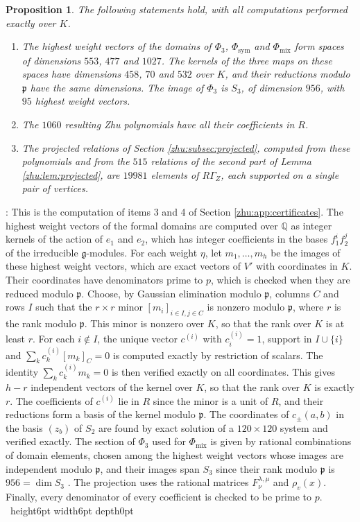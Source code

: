 \documentclass[leqno]{article}
\newcommand{\qed}{\hfill \vrule height6pt  width6pt depth0pt}
\newtheorem{prop}[thm]{Proposition}
\newenvironment{proof}[1][]{\noindent {\it Proof #1} : }{\hbox{~}\qed
\smallskip
}
\numberwithin{equation}{section}
\begin{document}
\begin{prop}
\label{zhu:prop:exact-families}
The following statements hold, with all computations performed exactly over $K$.
\begin{enumerate}
\item The highest weight vectors of the domains of $\Phi_3$, $\Phi_{\mathrm{sym}}$ and $\Phi_{\mathrm{mix}}$ form spaces of dimensions $553$, $477$ and $1027$. The kernels of the three maps on these spaces have dimensions $458$, $70$ and $532$ over $K$, and their reductions modulo $\mathfrak p$ have the same dimensions. The image of $\Phi_3$ is $S_3$, of dimension $956$, with $95$ highest weight vectors.
\item The $1060$ resulting Zhu polynomials have all their coefficients in $R$.
\item The projected relations of Section \ref{zhu:subsec:projected}, computed from these polynomials and from the $515$ relations of the second part of Lemma \ref{zhu:lem:projected}, are $19981$ elements of $R\Gamma_Z$, each supported on a single pair of vertices.
\end{enumerate}
\end{prop}

\begin{proof}
This is the computation of items 3 and 4 of Section \ref{zhu:app:certificates}. The highest weight vectors of the formal domains are computed over $\mathbb Q$ as integer kernels of the action of $e_1$ and $e_2$, which has integer coefficients in the bases $f_1^i f_2^j$ of the irreducible $\mathfrak g$-modules. For each weight $\eta$, let $m_1, \ldots, m_h$ be the images of these highest weight vectors, which are exact vectors of $V'$ with coordinates in $K$. Their coordinates have denominators prime to $p$, which is checked when they are reduced modulo $\mathfrak p$. Choose, by Gaussian elimination modulo $\mathfrak p$, columns $C$ and rows $I$ such that the $r \times r$ minor $[m_i]_{i \in I, j \in C}$ is nonzero modulo $\mathfrak p$, where $r$ is the rank modulo $\mathfrak p$. This minor is nonzero over $K$, so that the rank over $K$ is at least $r$. For each $i \notin I$, the unique vector $c^{(i)}$ with $c^{(i)}_i = 1$, support in $I \cup \{i\}$ and $\sum_k c^{(i)}_k [m_k]_C = 0$ is computed exactly by restriction of scalars. The identity $\sum_k c^{(i)}_k m_k = 0$ is then verified exactly on all coordinates. This gives $h - r$ independent vectors of the kernel over $K$, so that the rank over $K$ is exactly $r$. The coefficients of $c^{(i)}$ lie in $R$ since the minor is a unit of $R$, and their reductions form a basis of the kernel modulo $\mathfrak p$. The coordinates of $c_\pm(a,b)$ in the basis $(z_b)$ of $S_2$ are found by exact solution of a $120 \times 120$ system and verified exactly. The section of $\Phi_3$ used for $\Phi_{\mathrm{mix}}$ is given by rational combinations of domain elements, chosen among the highest weight vectors whose images are independent modulo $\mathfrak p$, and their images span $S_3$ since their rank modulo $\mathfrak p$ is $956 = \dim S_3$ \cite[Theorem 10.21]{Arh26}. The projection uses the rational matrices $F^{\lambda,\mu}_\nu$ and $\rho_v(x)$. Finally, every denominator of every coefficient is checked to be prime to $p$.
\end{proof}
\end{document}
